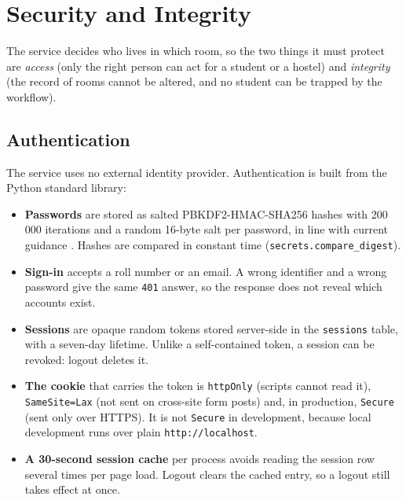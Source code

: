 
\chapter{Security and Integrity}
\label{ch:security}

The service decides who lives in which room, so the two things it must
protect are \emph{access} (only the right person can act for a student
or a hostel) and \emph{integrity} (the record of rooms cannot be
altered, and no student can be trapped by the workflow).

\section{Authentication}

The service uses no external identity provider. Authentication is built
from the Python standard library:

\begin{itemize}
  \item \textbf{Passwords} are stored as salted PBKDF2-HMAC-SHA256 hashes
  with 200\,000 iterations and a random 16-byte salt per password, in
  line with current guidance \cite{nist2017sp80063b}. Hashes are
  compared in constant time (\texttt{secrets.compare\_digest}).
  \item \textbf{Sign-in} accepts a roll number or an email. A wrong
  identifier and a wrong password give the same \texttt{401} answer, so
  the response does not reveal which accounts exist.
  \item \textbf{Sessions} are opaque random tokens stored server-side in
  the \texttt{sessions} table, with a seven-day lifetime. Unlike a
  self-contained token, a session can be revoked: logout deletes it.
  \item \textbf{The cookie} that carries the token is \texttt{httpOnly}
  (scripts cannot read it), \texttt{SameSite=Lax} (not sent on
  cross-site form posts) and, in production, \texttt{Secure} (sent only
  over HTTPS). It is not \texttt{Secure} in development, because local
  development runs over plain \texttt{http://localhost}.
  \item \textbf{A 30-second session cache} per process avoids reading the
  session row several times per page load. Logout clears the cached
  entry, so a logout still takes effect at once.
\end{itemize}

